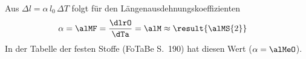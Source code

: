 Aus $\Delta l = \alpha\,l_0\,\Delta T$ folgt für den Längenausdehnungskoeffizienten
\begin{align}
 \alpha &= \alMF = \frac{\dlrO}{\dTa} = \alM \approx \result{\alMS{2}}
\end{align}
In der Tabelle der festen Stoffe (FoTaBe S.~190) hat  diesen Wert ($\alpha = \alMeO$).
